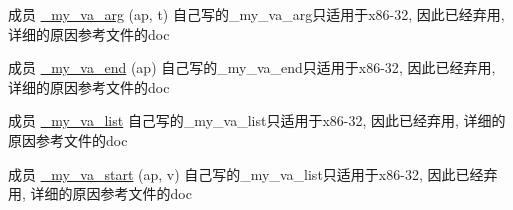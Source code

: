 
\begin{DoxyRefList}
\item[成员 \mbox{\hyperlink{stdarg_8h_a7b0f2a88c33d642ab5d0298f3c4b3035}{\+\_\+my\+\_\+va\+\_\+arg}} (ap, t)]\label{deprecated__deprecated000003}%
%
自己写的{\ttfamily \+\_\+my\+\_\+va\+\_\+arg}只适用于{\ttfamily x86-\/32}, 因此已经弃用, 详细的原因参考文件的doc  
\item[成员 \mbox{\hyperlink{stdarg_8h_af6468ba7e0b5727b681dd3905208872d}{\+\_\+my\+\_\+va\+\_\+end}} (ap)]\label{deprecated__deprecated000004}%
%
自己写的{\ttfamily \+\_\+my\+\_\+va\+\_\+end}只适用于{\ttfamily x86-\/32}, 因此已经弃用, 详细的原因参考文件的doc  
\item[成员 \mbox{\hyperlink{stdarg_8h_a7606ba07f197c44b4185b4ce441e0d76}{\+\_\+my\+\_\+va\+\_\+list}} ]\label{deprecated__deprecated000001}%
%
自己写的{\ttfamily \+\_\+my\+\_\+va\+\_\+list}只适用于{\ttfamily x86-\/32}, 因此已经弃用, 详细的原因参考文件的doc  
\item[成员 \mbox{\hyperlink{stdarg_8h_ae641e06b00550c111ccb048aafe0fc4b}{\+\_\+my\+\_\+va\+\_\+start}} (ap, v)]\label{deprecated__deprecated000002}%
%
自己写的{\ttfamily \+\_\+my\+\_\+va\+\_\+list}只适用于{\ttfamily x86-\/32}, 因此已经弃用, 详细的原因参考文件的doc 
\end{DoxyRefList}